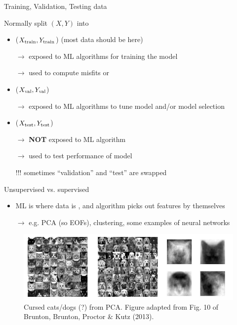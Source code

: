 \documentclass[xcolor=x11names,compress]{beamer}
\renewcommand{\(}{\begin{columns}}
\renewcommand{\)}{\end{columns}}
\newcommand{\<}[1]{\begin{column}{#1}}
\renewcommand{\>}{\end{column}}
\begin{document}

\begin{frame}{Training, Validation, Testing data}

Normally split $(X, Y)$ into
\begin{itemize}
  \item {} ($X_{\rm train}, Y_{\rm train}$) {\tiny (most
  data should be here)}
  \item[] $\to$ exposed to ML algorithms for training the model
  \item[] $\to$ used to compute misfits or 
  \item {} ($X_{\rm val}, Y_{\rm val}$)
  \item[] $\to$ exposed to ML algorithms to tune model
   and/or model selection
  \item {} ($X_{\rm test}, Y_{\rm test}$)
  \item[] $\to$ \textbf{NOT} exposed to ML algorithm
  \item[] $\to$ used to test performance of model
  \item[]
  \item[!!!] sometimes ``validation'' and ``test'' are swapped
\end{itemize}

\end{frame}


\begin{frame}{Unsupervised vs. supervised}

\begin{itemize}
  \item {} ML is where data is , and
  algorithm picks out features by themselves
  \item[] $\to$ e.g. PCA (so EOFs), clustering, some examples of neural networks
\end{itemize}

\begin{figure}
  \includegraphics[width=\textwidth]{brunton_et_al_2013}
  \caption{Cursed cats/dogs (?) from PCA. Figure adapted from Fig. 10 of
  Brunton, Brunton, Proctor \& Kutz (2013).}
\end{figure}

\end{frame}
\end{document}
